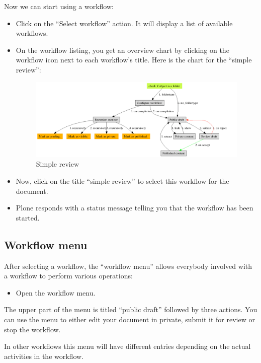Now we can start using a workflow:
\begin{itemize}
\item Click on the ``Select workflow'' action. It will display a list of available workflows.
\item On the workflow listing, you get an overview chart by clicking on the workflow
    icon next to each workflow's title. Here is the chart for the ``simple review'':
\begin{figure}
  \centering
  \includegraphics[width=19cm]{simplereview}
  \caption{\label{fig:simplereview}%
    Simple review}
\end{figure}
\item Now, click on the title ``simple review'' to select this workflow for the document.
\item Plone responds with a status message telling you that the workflow has been started.
\end{itemize}

\subsection{Workflow menu}

After selecting a workflow, the ``workflow menu'' allows everybody involved
with a workflow to perform various operations:

\begin{itemize}
\item Open the workflow menu.
\end{itemize}

The upper part of the menu is titled ``public draft'' followed by three
actions.  You can use the menu to either edit your document in private, submit
it for review or stop the workflow.

In other workflows this menu will have different entries depending on the
actual activities in the workflow.

